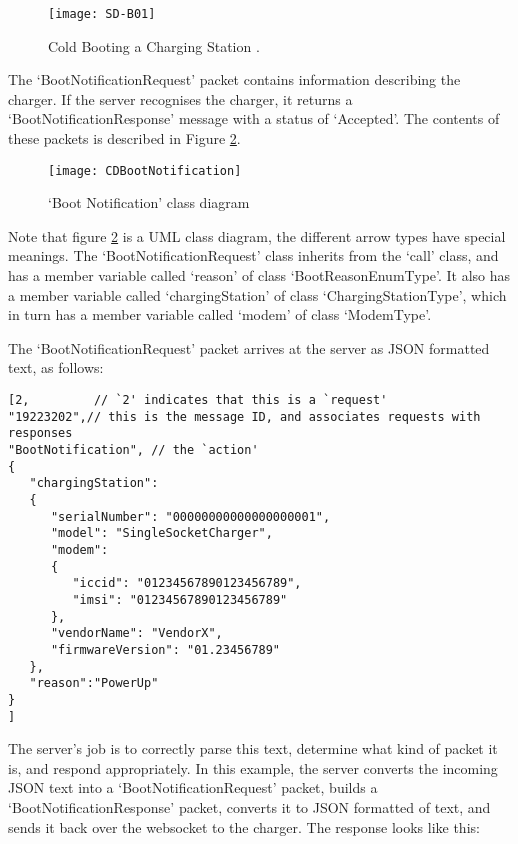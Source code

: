 \documentclass[12pt,openany,a4paper]{book}
\begin{document}
	\begin{center}
		\begin{figure}[H]
			\texttt{[image: SD-B01]}
			\caption{Cold Booting a Charging Station \cite{ocpp2b}.}
			\label{fig:SD-B01}
		\end{figure}
	\end{center}
	
The `BootNotificationRequest' packet contains information describing the charger. If the server recognises the charger, it returns a `BootNotificationResponse' message with a status of `Accepted'. The contents of these packets is described in Figure \ref{fig:CDBootNotification}.

	\begin{center}
		\begin{figure}[H]
			\texttt{[image: CDBootNotification]}
			\caption{`Boot Notification' class diagram}
			\label{fig:CDBootNotification}
		\end{figure}
	\end{center}
	
Note that figure \ref{fig:CDBootNotification} is a UML class diagram, the different arrow types have special meanings. The `BootNotificationRequest' class inherits from the `call' class, and has a member variable called `reason' of class `BootReasonEnumType'. It also has a member variable called `chargingStation' of class `ChargingStationType', which in turn has a member variable called `modem' of class `ModemType'.

\pagebreak
The `BootNotificationRequest' packet arrives at the server as JSON formatted text, as follows:
\begin{verbatim}
[2,	        // `2' indicates that this is a `request'
"19223202",// this is the message ID, and associates requests with responses
"BootNotification", // the `action'
{
   "chargingStation":
   {
      "serialNumber": "00000000000000000001",
      "model": "SingleSocketCharger",
      "modem":
      {
         "iccid": "01234567890123456789",
         "imsi": "01234567890123456789"
      },
      "vendorName": "VendorX",
      "firmwareVersion": "01.23456789"
   },
   "reason":"PowerUp"
}
]
\end{verbatim}

The server's job is to correctly parse this text, determine what kind of packet it is, and respond appropriately. In this example, the server converts the incoming JSON text into a `BootNotificationRequest' packet, builds a `BootNotificationResponse' packet, converts it to JSON formatted of text, and sends it back over the websocket to the charger. The response looks like this:
\end{document}
